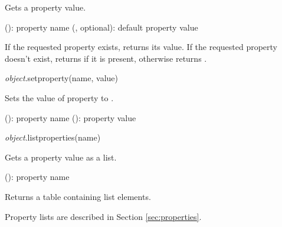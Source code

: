 \documentclass[a4paper,12pt,twoside,extrafontsizes]{memoir}
\begin{document}
\begin{funcdescr}
	Gets a property value.
\end{funcdescr}

\begin{funcparams}
	 (): property name
	 (, optional): default property value
\end{funcparams}

\begin{funcret}
	If the requested property exists, returns its value. If the requested property doesn't exist, returns  if it is present, otherwise returns .
\end{funcret}


\begin{luafuncprototype}
\emph{object}.setproperty(name, value)
\end{luafuncprototype}

\begin{funcdescr}
	Sets the value of  property to .
\end{funcdescr}

\begin{funcparams}
	 (): property name
	 (): property value
\end{funcparams}


\begin{luafuncprototype}
\emph{object}.listproperties(name)
\end{luafuncprototype}

\begin{funcdescr}
	Gets a property value as a list.
\end{funcdescr}

\begin{funcparams}
	 (): property name
\end{funcparams}

\begin{funcret}
	Returns a table containing list elements.
\end{funcret}

\begin{funcremarks}
	Property lists are described in Section \ref{sec:properties}.
\end{funcremarks}
\end{document}
